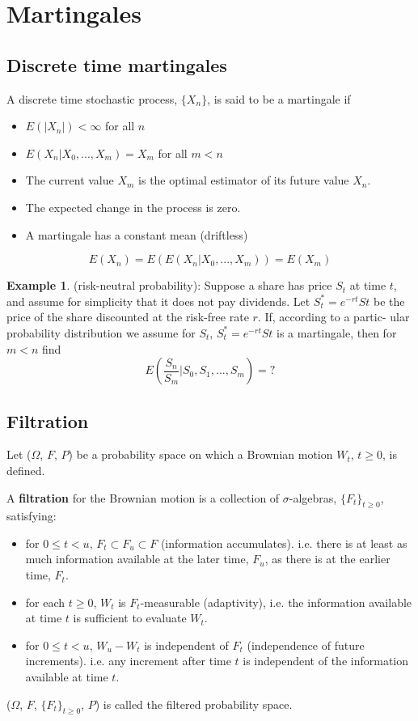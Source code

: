 \documentclass[11pt,a4paper]{book}
\theoremstyle{definition}\newtheorem{definition}{Definition}
\theoremstyle{definition}\newtheorem{fact}{Fact}
\theoremstyle{definition}\newtheorem{remark}{Remark}
\theoremstyle{definition}\newtheorem{ex}{Ex.}
\theoremstyle{definition}\newtheorem{project}{Project}
\theoremstyle{definition}\newtheorem{problem}{Problem}
\theoremstyle{definition}\newtheorem{example}{Example}
\numberwithin{theorem}{section}
\numberwithin{corollary}{chapter}
\numberwithin{assumption}{chapter}
\numberwithin{definition}{chapter}
\numberwithin{prop}{chapter}
\numberwithin{notation}{chapter}
\numberwithin{problem}{chapter}
\numberwithin{example}{chapter}
\numberwithin{fact}{chapter}
\numberwithin{ex}{chapter}
\begin{document}
\section{Martingales}

\subsection{Discrete time martingales}
A discrete time stochastic process, $\{X_n\}$, is said to be a martingale if
\begin{itemize}
\item $E(|X_n|) < \infty$ for all $n$
\item $E(X_n | X_0, ..., X_m) = X_m$ for all $m<n$
\end{itemize}

\begin{itemize}[label={$\Rightarrow$}]
\item The current value $X_m$ is the optimal estimator of its future value $X_n$. 
\item The expected change in the process is zero.
\item A martingale has a constant mean (driftless)
\end{itemize}
$$E(X_n) = E(E(X_n | X_0, ..., X_m)) = E(X_m) $$
\begin{example}
(risk-neutral probability): Suppose a share has price $S_t$ at time $t$, and assume for simplicity that it does not pay dividends. Let $S_t^* = e^{-rt} St$ be the price of the share discounted at the risk-free rate $r$. If, according to a partic-
ular probability distribution we assume for $S_t$, $S_t^* = e^{-rt} St$ is a martingale, then for $m<n$ find
$$ E\left( \frac{S_n}{S_m} | S_0, S_1, ..., S_m \right) = ? $$
\end{example}

\subsection{Filtration}
Let ($\Omega$, $F$, $P$) be a probability space on which a Brownian motion $W_t$, $t \geq 0$, is defined.

A \textbf{filtration} for the Brownian motion is a collection of $\sigma$-algebras, $\{F_t\}_{t\geq0}$, satisfying:
\begin{itemize}
\item for $0 \leq t < u$, $F_t \subset F_u \subset F$ (information accumulates). i.e. there is at least as much information available at the later time, $F_u$, as there is at the earlier time, $F_t$.
\item for each $t \geq 0$, $W_t$ is $F_t$-measurable (adaptivity), i.e. the information available at time $t$ is sufficient to evaluate $W_t$.
\item for $0\leq t<u$, $W_u - W_t$ is independent of $F_t$ (independence of future increments). i.e. any increment after time $t$ is independent of the information available at time $t$.
\end{itemize}
($\Omega$, $F$, $\{F_t\}_{t\geq0}$, $P$) is called the filtered probability space.
\end{document}
